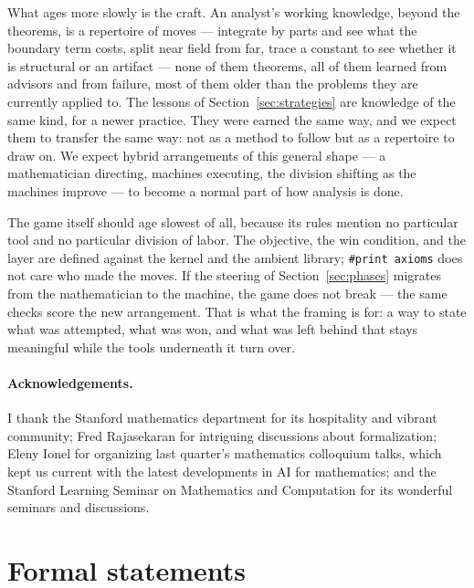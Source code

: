 \documentclass[11pt]{article}
\theoremstyle{plain}
\theoremstyle{definition}
\theoremstyle{remark}
\newcommand{\lean}[1]{\texttt{#1}}
\newcommand{\printaxioms}{\lean{\#print axioms}}
\begin{document}
What ages more slowly is the craft. An analyst's working knowledge, beyond the
theorems, is a repertoire of moves --- integrate by parts and see what the
boundary term costs, split near field from far, trace a constant to see whether
it is structural or an artifact --- none of them theorems, all of them learned
from advisors and from failure, most of them older than the problems they are
currently applied to. The lessons of Section~\ref{sec:strategies} are knowledge
of the same kind, for a newer practice. They were earned the same way, and we
expect them to transfer the same way: not as a method to follow but as a
repertoire to draw on. We expect hybrid arrangements of this general shape ---
a mathematician directing, machines executing, the division shifting as the
machines improve --- to become a normal part of how analysis is done.

The game itself should age slowest of all, because its rules mention no
particular tool and no particular division of labor. The objective, the win
condition, and the layer are defined against the kernel and the ambient library;
\printaxioms{} does not care who made the moves. If the steering of
Section~\ref{sec:phases} migrates from the mathematician to the machine, the
game does not break --- the same checks score the new arrangement. That is what
the framing is for: a way to state what was attempted, what was won, and what
was left behind that stays meaningful while the tools underneath it turn over.

\paragraph{Acknowledgements.}
I thank the Stanford mathematics department for its hospitality and vibrant
community; Fred Rajasekaran for intriguing discussions about formalization;
Eleny Ionel for organizing last quarter's mathematics colloquium talks, which
kept us current with the latest developments in AI for mathematics; and the
Stanford Learning Seminar on Mathematics and Computation for its wonderful
seminars and discussions.

\appendix
\section{Formal statements}\label{app:formal}
\end{document}
